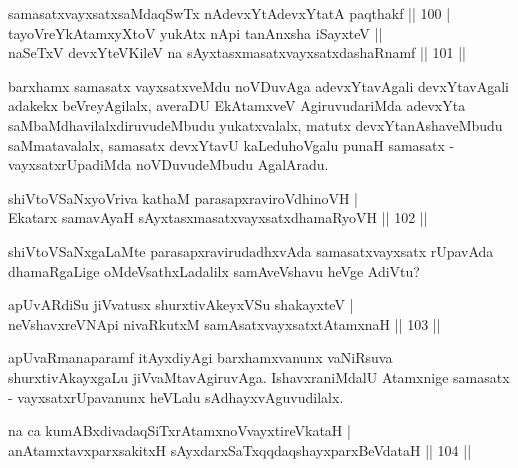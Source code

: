 
\begin{shl}
samasatxvayxsatxsaMdaqSwTx nAdevxYtAdevxYtatA paqthakf \hfill || 100 |\\
tayoVreYkAtamxyXtoV yukAtx nApi tanAnxsha iSayxteV ||\\
naSeTxV devxYteV\s KileV na sAyxtasxmasatxvayxsatxdashaRnamf \hfill || 101 ||
\end{shl}

\begin{artha}
barxhamx samasatx vayxsatxveMdu noVDuvAga adevxYtavAgali devxYtavAgali adakekx beVreyAgilalx, averaDU EkAtamxveV AgiruvudariMda adevxYta saMbaMdhavilalxdiruvudeMbudu yukatxvalalx, matutx devxYtanAshaveMbudu saMmatavalalx, samasatx devxYtavU kaLeduhoVgalu punaH samasatx - vayxsatxrUpadiMda noVDuvudeMbudu AgalAradu.
\end{artha}


\begin{shl}
shiVtoVSaNxyoVriva kathaM parasapxraviroVdhinoVH |\\
Ekatarx samavAyaH sAyxtasxmasatxvayxsatxdhamaRyoVH \hfill || 102 ||
\end{shl}

\begin{artha}
shiVtoVSaNxgaLaMte parasapxravirudadhxvAda samasatxvayxsatx rUpavAda dhamaRgaLige oMdeVsathxLadalilx samAveVshavu heVge AdiVtu? 
\end{artha}


\begin{shl}
apUvARdiSu jiVvatusx shurxtivAkeyxVSu shakayxteV |\\
neVshavxreVNApi nivaRkutxM samAsatxvayxsatxtA\s \s tamxnaH \hfill || 103 ||
\end{shl}

\begin{artha}
apUvaRmanaparamf itAyxdiyAgi barxhamxvanunx vaNiRsuva shurxtivAkayxgaLu jiVvaMtavAgiruvAga. IshavxraniMdalU Atamxnige samasatx - vayxsatxrUpavanunx heVLalu sAdhayxvAguvudilalx.
\end{artha}


\begin{shl}
na ca kumABxdivadaqSiTxrAtamxnoV\s vayxtireVkataH |\\
anAtamxtavxparxsakitxH sAyxdarxSaTxqqdaqshayxparxBeVdataH \hfill || 104 ||
\end{shl}

